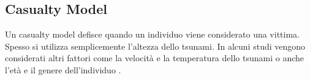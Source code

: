 \subsection{Casualty Model}
Un casualty model defisce quando un individuo viene considerato una vittima.
Spesso si utilizza semplicemente l'altezza dello tsunami.
In alcuni studi vengono considerati altri fattori come la velocità
e la temperatura dello tsunami o anche l'età e il genere dell'individuo \cite{yeh2010gender}.

